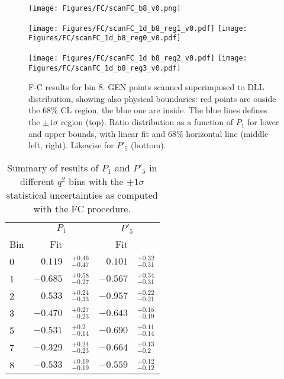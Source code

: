 \begin{figure}
  \centering
  \texttt{[image: Figures/FC/scanFC\_b8\_v0.png]}

  \texttt{[image: Figures/FC/scanFC\_1d\_b8\_reg1\_v0.pdf]}
  \texttt{[image: Figures/FC/scanFC\_1d\_b8\_reg0\_v0.pdf]}

  \texttt{[image: Figures/FC/scanFC\_1d\_b8\_reg2\_v0.pdf]}
  \texttt{[image: Figures/FC/scanFC\_1d\_b8\_reg3\_v0.pdf]}

  \caption{F-C results for bin 8.
    GEN points scanned superimposed to DLL distribution, showing also physical boundaries: red points are ouside the 68\% CL region, the blue one are inside.
    The blue lines defines the $\pm1\sigma$ region (top).
    Ratio distribution as a function of $P_1$ for lower and upper bounds, with linear fit and 68\% horizontal line (middle left, right).
    Likewise for $P'_5$ (bottom).}
  \label{fig:FC8}
\end{figure}

\begin{table*}[!htb]

  \begin{center}
    \caption{Summary of results of $P_1$ and $P'_5$ in different $q^2$ bins with the $\pm1\sigma$ statistical uncertainties as computed with the FC procedure.}\label{tab:FC}

    \begin{tabular}{l|rl|rl}
      & \multicolumn{2}{c|}{$P_1$} &  \multicolumn{2}{c}{$P'_5$} \\ 
      Bin  & Fit & & Fit &   \\ 
      \hline
      0 &  $0.119 $  &$^{+ 0.46}_{- 0.47}$ & $0.101$  & $^{+ 0.32}_{- 0.31}$ \\
      1 &  $-0.685$ &$^{+ 0.58}_{- 0.27}$  & $-0.567$ & $^{+ 0.34}_{- 0.31}$ \\
      2 &  $0.533 $  &$^{+ 0.24}_{- 0.33}$ & $-0.957$ & $^{+ 0.22}_{- 0.21}$ \\
      3 &  $-0.470$ &$^{+ 0.27}_{- 0.23}$  & $-0.643$ & $^{+ 0.15}_{- 0.19}$ \\
      5 &  $-0.531$ &$^{+ 0.2}_{- 0.14} $  & $-0.690$ & $^{+ 0.11}_{- 0.14}$ \\
      7 &  $-0.329$ &$^{+ 0.24}_{- 0.23}$  & $-0.664$ & $^{+ 0.13}_{- 0.2}$ \\
      8 &  $-0.533$ &$^{+ 0.19}_{- 0.19}$  & $-0.559$ & $^{+ 0.12}_{- 0.12}$ \\
      \hline                                                  

    \end{tabular}
  \end{center}
\end{table*}

